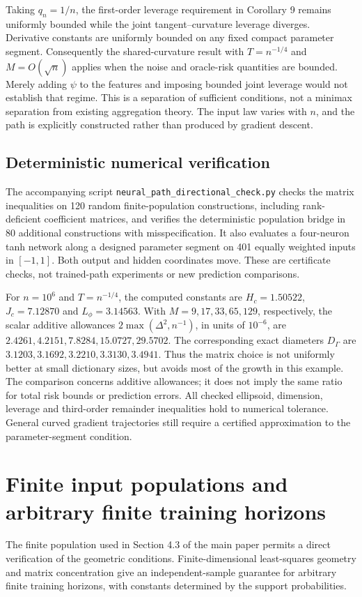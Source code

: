 \documentclass[pdflatex,sn-mathphys-ay]{sn-jnl}
\theoremstyle{remark}\newtheorem{remark}[theorem]{Remark}
\begin{document}
Taking $q_n=1/n$, the first-order leverage requirement in Corollary 9 remains uniformly bounded while the joint tangent--curvature leverage diverges. Derivative constants are uniformly bounded on any fixed compact parameter segment. Consequently the shared-curvature result with $T=n^{-1/4}$ and $M=O(\sqrt n)$ applies when the noise and oracle-risk quantities are bounded. Merely adding $\psi$ to the features and imposing bounded joint leverage would not establish that regime. This is a separation of sufficient conditions, not a minimax separation from existing aggregation theory. The input law varies with $n$, and the path is explicitly constructed rather than produced by gradient descent.

\subsection{Deterministic numerical verification}
The accompanying script \texttt{neural\_path\_directional\_check.py} checks the matrix inequalities on 120 random finite-population constructions, including rank-deficient coefficient matrices, and verifies the deterministic population bridge in 80 additional constructions with misspecification. It also evaluates a four-neuron tanh network along a designed parameter segment on 401 equally weighted inputs in $[-1,1]$. Both output and hidden coordinates move. These are certificate checks, not trained-path experiments or new prediction comparisons.

For $n=10^6$ and $T=n^{-1/4}$, the computed constants are $H_c=1.50522$, $J_c=7.12870$ and $L_\phi=3.14563$. With $M=9,17,33,65,129$, respectively, the scalar additive allowances $2\max(\Delta^2,n^{-1})$, in units of $10^{-6}$, are $2.4261,4.2151,7.8284,15.0727,29.5702$. The corresponding exact diameters $D_\Gamma$ are $3.1203,3.1692,3.2210,3.3130,3.4941$. Thus the matrix choice is not uniformly better at small dictionary sizes, but avoids most of the growth in this example. The comparison concerns additive allowances; it does not imply the same ratio for total risk bounds or prediction errors. All checked ellipsoid, dimension, leverage and third-order remainder inequalities hold to numerical tolerance. General curved gradient trajectories still require a certified approximation to the parameter-segment condition.

\section{Finite input populations and arbitrary finite training horizons}\label{sec:finiteclosure}
The finite population used in Section 4.3 of the main paper permits a direct verification of the geometric conditions. Finite-dimensional least-squares geometry and matrix concentration give an independent-sample guarantee for arbitrary finite training horizons, with constants determined by the support probabilities.
\end{document}
